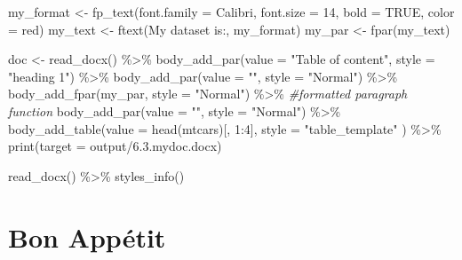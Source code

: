 \documentclass[
]{book}
\newenvironment{Shaded}{\begin{snugshade}}{\end{snugshade}}
\newcommand{\AttributeTok}[1]{\textcolor[rgb]{0.77,0.63,0.00}{#1}}
\newcommand{\CommentTok}[1]{\textcolor[rgb]{0.56,0.35,0.01}{\textit{#1}}}
\newcommand{\ConstantTok}[1]{\textcolor[rgb]{0.00,0.00,0.00}{#1}}
\newcommand{\DecValTok}[1]{\textcolor[rgb]{0.00,0.00,0.81}{#1}}
\newcommand{\FunctionTok}[1]{\textcolor[rgb]{0.00,0.00,0.00}{#1}}
\newcommand{\NormalTok}[1]{#1}
\newcommand{\OtherTok}[1]{\textcolor[rgb]{0.56,0.35,0.01}{#1}}
\newcommand{\SpecialCharTok}[1]{\textcolor[rgb]{0.00,0.00,0.00}{#1}}
\newcommand{\StringTok}[1]{\textcolor[rgb]{0.31,0.60,0.02}{#1}}
\begin{document}
\begin{Shaded}
\begin{Highlighting}[]
\NormalTok{my\_format }\OtherTok{\textless{}{-}} \FunctionTok{fp\_text}\NormalTok{(}\AttributeTok{font.family =} \StringTok{\textquotesingle{}Calibri\textquotesingle{}}\NormalTok{, }\AttributeTok{font.size =} \DecValTok{14}\NormalTok{, }\AttributeTok{bold =} \ConstantTok{TRUE}\NormalTok{, }\AttributeTok{color =} \StringTok{\textquotesingle{}red\textquotesingle{}}\NormalTok{)}
\NormalTok{my\_text }\OtherTok{\textless{}{-}} \FunctionTok{ftext}\NormalTok{(}\StringTok{\textquotesingle{}My dataset is:\textquotesingle{}}\NormalTok{, my\_format)}
\NormalTok{my\_par }\OtherTok{\textless{}{-}} \FunctionTok{fpar}\NormalTok{(my\_text)}

\NormalTok{doc }\OtherTok{\textless{}{-}} \FunctionTok{read\_docx}\NormalTok{() }\SpecialCharTok{\%\textgreater{}\%} 
  \FunctionTok{body\_add\_par}\NormalTok{(}\AttributeTok{value =} \StringTok{"Table of content"}\NormalTok{, }\AttributeTok{style =} \StringTok{"heading 1"}\NormalTok{) }\SpecialCharTok{\%\textgreater{}\%} 
  \FunctionTok{body\_add\_par}\NormalTok{(}\AttributeTok{value =} \StringTok{""}\NormalTok{, }\AttributeTok{style =} \StringTok{"Normal"}\NormalTok{) }\SpecialCharTok{\%\textgreater{}\%} 
  \FunctionTok{body\_add\_fpar}\NormalTok{(my\_par, }\AttributeTok{style =} \StringTok{"Normal"}\NormalTok{) }\SpecialCharTok{\%\textgreater{}\%} \CommentTok{\#formatted paragraph function}
  \FunctionTok{body\_add\_par}\NormalTok{(}\AttributeTok{value =} \StringTok{""}\NormalTok{, }\AttributeTok{style =} \StringTok{"Normal"}\NormalTok{) }\SpecialCharTok{\%\textgreater{}\%} 
  \FunctionTok{body\_add\_table}\NormalTok{(}\AttributeTok{value =} \FunctionTok{head}\NormalTok{(mtcars)[, }\DecValTok{1}\SpecialCharTok{:}\DecValTok{4}\NormalTok{], }\AttributeTok{style =} \StringTok{"table\_template"}\NormalTok{ ) }\SpecialCharTok{\%\textgreater{}\%} 
  \FunctionTok{print}\NormalTok{(}\AttributeTok{target =} \StringTok{\textquotesingle{}output/6.3.mydoc.docx\textquotesingle{}}\NormalTok{)}

\FunctionTok{read\_docx}\NormalTok{() }\SpecialCharTok{\%\textgreater{}\%} \FunctionTok{styles\_info}\NormalTok{() }
\end{Highlighting}
\end{Shaded}

\hypertarget{part-bon-appuxe9tit}{%
\part*{Bon Appétit}\label{part-bon-appuxe9tit}}
\end{document}
